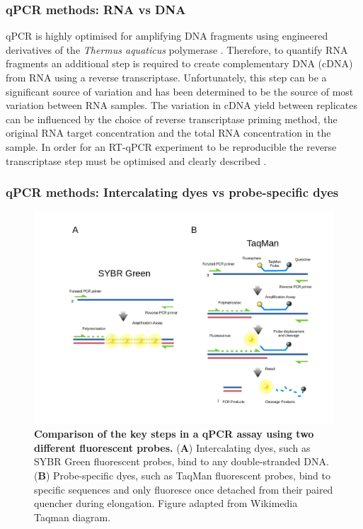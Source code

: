 \documentclass[../main.tex]{subfiles}
\begin{document}
\subsubsection{qPCR methods: RNA vs DNA}

qPCR is highly optimised for amplifying DNA fragments using engineered derivatives of the \textit{Thermus aquaticus} polymerase \parencite{Witte2018}. 
Therefore, to quantify RNA fragments an additional step is required to create complementary DNA (cDNA) from RNA using a reverse transcriptase. 
Unfortunately, this step can be a significant source of variation and has been determined to be the source of most variation between RNA samples. 
The variation in cDNA yield between replicates can be influenced by the choice of reverse transcriptase priming method, the original RNA target concentration and the total RNA concentration in the sample. 
In order for an RT-qPCR experiment to be reproducible the reverse transcriptase step must be optimised and clearly described \parencite{Stahlberg2004}. 

\subsubsection{qPCR methods: Intercalating dyes vs probe-specific dyes}

\begin{figure}[h]

{\centering \includegraphics[width=\linewidth]{figures/taqmanvssybrgreen} 

}

\caption[Key steps in a qPCR assay.]{\textbf{Comparison of the key steps in a qPCR assay using two different fluorescent probes.} (\textbf{A}) Intercalating dyes, such as SYBR Green fluorescent probes, bind to any double-stranded DNA. (\textbf{B}) Probe-specific dyes, such as TaqMan fluorescent probes, bind to specific sequences and only fluoresce once detached from their paired quencher during elongation. Figure adapted from Wikimedia Taqman diagram.}\label{fig:qpcr-fluo-tech}
\end{figure}
\end{document}
